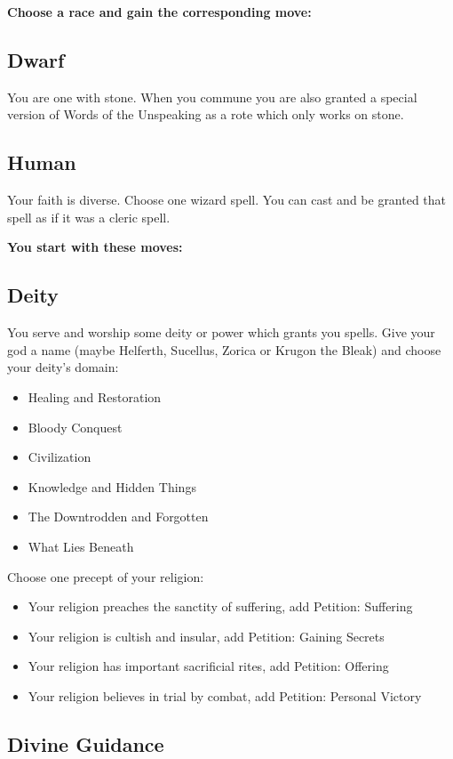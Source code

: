 {\bfseries Choose a race and gain the corresponding move:}
\subsection{Dwarf}

You are one with stone. When you commune you are also granted a special version of Words of the Unspeaking as a rote which only works on stone.
\subsection{Human}

Your faith is diverse. Choose one wizard spell. You can cast and be granted that spell as if it was a cleric spell.

\vspace{\baselineskip}
{\bfseries You start with these moves:}
\subsection{Deity}

You serve and worship some deity or power which grants you spells. Give your god a name (maybe Helferth, Sucellus, Zorica or Krugon the Bleak) and choose your deity's domain:
\begin{itemize}
\item Healing and Restoration
\item Bloody Conquest
\item Civilization
\item Knowledge and Hidden Things
\item The Downtrodden and Forgotten
\item What Lies Beneath

\end{itemize}

Choose one precept of your religion:
\begin{itemize}
\item Your religion preaches the sanctity of suffering, add Petition: Suffering
\item Your religion is cultish and insular, add Petition: Gaining Secrets
\item Your religion has important sacrificial rites, add Petition: Offering
\item Your religion believes in trial by combat, add Petition: Personal Victory

\end{itemize}
\subsection{Divine Guidance}

